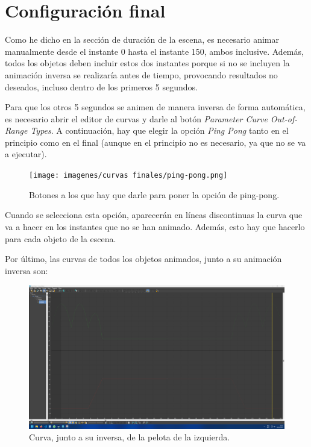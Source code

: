 \section{Configuración final}

Como he dicho en la sección de duración de la escena, es necesario animar manualmente desde el instante 0 hasta el instante 150, ambos inclusive. Además, todos los objetos deben incluir estos dos instantes porque si no se incluyen la animación inversa se realizaría antes de tiempo, provocando resultados no deseados, incluso dentro de los primeros 5 segundos. 

\bigskip

Para que los otros 5 segundos se animen de manera inversa de forma automática, es necesario abrir el editor de curvas y darle al botón \textit{Parameter Curve Out-of-Range Types}. A continuación, hay que elegir la opción \textit{Ping Pong} tanto en el principio como en el final (aunque en el principio no es necesario, ya que no se va a ejecutar).

\begin{figure}[H]
   \centering
   \texttt{[image: imagenes/curvas finales/ping-pong.png]}
   \caption{Botones a los que hay que darle para poner la opción de ping-pong.}
\end{figure}

Cuando se selecciona esta opción, aparecerán en líneas discontinuas la curva que va a hacer en los instantes que no se han animado. Además, esto hay que hacerlo para cada objeto de la escena.

\bigskip

Por último, las curvas de todos los objetos animados, junto a su animación inversa son:

\begin{figure}[H]
   \centering
   \includegraphics[width=\textwidth]{imagenes/curvas finales/PL.png}
   \caption{Curva, junto a su inversa, de la pelota de la izquierda.}
\end{figure}

